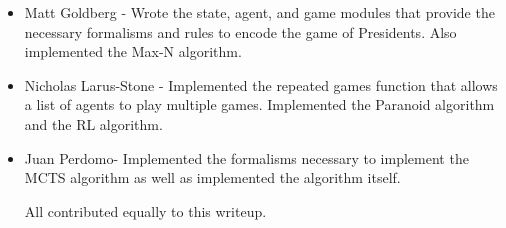\documentclass[11pt]{article}
\begin{document}
\begin{itemize}
\item Matt Goldberg - Wrote the state, agent, and game modules that provide the necessary formalisms and rules to encode the game of Presidents. Also implemented the Max-N algorithm.
\item Nicholas Larus-Stone - Implemented the repeated games function that allows a list of agents to play multiple games. Implemented the Paranoid algorithm and the RL algorithm.

\item Juan Perdomo-  Implemented the formalisms necessary to implement the MCTS algorithm as well as implemented the algorithm itself.

All contributed equally to this writeup.
\end{itemize}
\end{document}
